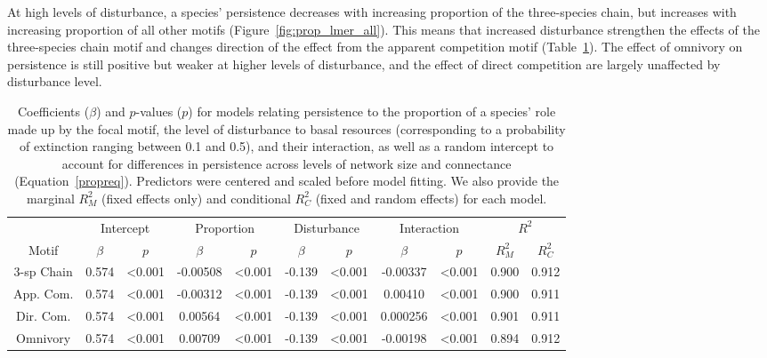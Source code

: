 \documentclass[12pt]{article}
\begin{document}
\begin{spacing}{2.0}
            At high levels of disturbance, a species' persistence decreases with increasing proportion of the three-species chain, but increases with increasing proportion of all other motifs (Figure~\ref{fig:prop_lmer_all}).
            This means that increased disturbance strengthen the effects of the three-species chain motif and changes direction of the effect from the apparent competition motif  (Table~\ref{tab:proportion}).
            The effect of omnivory on persistence is still positive but weaker at higher levels of disturbance, and the effect of direct competition are largely unaffected by disturbance level.
    
    
            \begin{table}[hb!]
                \centering
                \caption{Coefficients ($\beta$) and $p$-values ($p$) for models relating persistence to the proportion of a species' role made up by the focal motif, the level of disturbance to basal resources (corresponding to a probability of extinction ranging between 0.1 and 0.5), and their interaction, as well as a random intercept to account for differences in persistence across levels of network size and connectance (Equation~\ref{propreq}). Predictors were centered and scaled before model fitting. We also provide the marginal $R^2_M$ (fixed effects only) and conditional $R^2_C$ (fixed and random effects) for each model.}
                \label{tab:proportion}                \footnotesize
                \begin{tabular}{c|c c | c c | c c | c c | c c |}
                & \multicolumn{2}{c|}{Intercept} & \multicolumn{2}{c|}{Proportion} & \multicolumn{2}{c|}{Disturbance} & \multicolumn{2}{c|}{Interaction} & \multicolumn{2}{c|}{$R^2$} \\
                Motif & $\beta$ & $p$ & $\beta$ & $p$ & $\beta$ & $p$ & $\beta$ & $p$ & $R^2_M$ & $R^2_C$ \\
                \hline
                3-sp Chain & 0.574 & \textless0.001 & -0.00508 & \textless0.001 & -0.139 & \textless0.001 & -0.00337 & \textless0.001 & 0.900 & 0.912 \\
                App. Com. & 0.574 & \textless0.001 & -0.00312 & \textless0.001 & -0.139 & \textless0.001 & 0.00410 & \textless0.001 & 0.900 & 0.911 \\
                Dir. Com. & 0.574 & \textless0.001 & 0.00564 & \textless0.001 & -0.139 & \textless0.001 & 0.000256 & \textless0.001 & 0.901 & 0.911 \\
                Omnivory & 0.574 & \textless0.001 & 0.00709 & \textless0.001 & -0.139 & \textless0.001 & -0.00198 & \textless0.001 & 0.894 & 0.912 \\
                \end{tabular}
            \end{table}        
            

\end{spacing}
\end{document}

